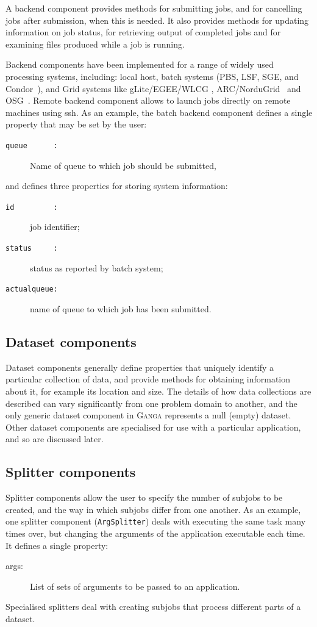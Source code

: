 \documentclass{elsart}
\def\ganga {\textsc{Ganga}\xspace}
\def\grid {Grid\xspace}
\newcommand{\code}[1]{\texttt{#1}}
\begin{document}
A backend component provides methods for submitting jobs, and for cancelling
jobs after submission, when this is needed.  It also provides methods for
updating information on job status, for retrieving output of completed jobs
and for examining files produced while a job is running.

Backend components have been implemented for a range of widely used
processing systems, including: local host, batch systems (PBS, LSF,
SGE, and Condor~\cite{Batch}), and \grid systems like
gLite/EGEE/WLCG \cite{LCG}, ARC/NorduGrid~\cite{NorduGrid} and OSG~\cite{OSG}. Remote
backend component allows to launch jobs directly on remote machines
using ssh.  As an example, the batch backend component defines a
single property that may be set by the user:
\begin{description}
\item[\code{queue~~~~~~:}] Name of queue to which job should be submitted,
\end{description}
and defines three properties for storing system information:
\begin{description}
\item[\code{id~~~~~~~~~:}] job identifier;
\item[\code{status~~~~~:}] status as reported by batch system;
\item[\code{actualqueue:}] name of queue to which job has been submitted.
\end{description}

\subsection{Dataset components}
Dataset components generally define properties that uniquely identify a
particular collection of data, and provide methods for obtaining information
about it, for example its location and size. The details of how data
collections are described can vary significantly from one problem domain to
another, and the only generic dataset component in \ganga represents a null
(empty) dataset.  Other dataset components are specialised for use with a
particular application, and so are discussed later.

\subsection{Splitter components}
Splitter components allow the user to specify the number of subjobs to be
created, and the way in which subjobs differ from one another. As an example,
one splitter component (\code{ArgSplitter}) deals with executing the same task
many times over, but changing the arguments of the application executable each
time. It defines a single property:
\begin{description}
\item[args:] List of sets of arguments to be passed to an application.
\end{description}
Specialised splitters deal with creating subjobs that process different parts
of a dataset.
\end{document}
